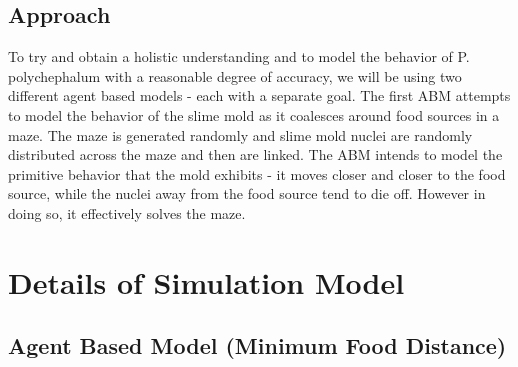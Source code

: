 \documentclass[a4paper, 11pt]{article}
\begin{document}
\subsection{Approach}

To try and obtain a holistic understanding and to model the behavior of P. polychephalum with a reasonable degree of accuracy, we will be using two different agent based models - each with a separate goal. The first ABM attempts to model the behavior of the slime mold as it coalesces around food sources in a maze. The maze is generated randomly and slime mold nuclei are randomly distributed across the maze and then are linked. The ABM intends to model the primitive behavior that the mold exhibits - it moves closer and closer to the food source, while the nuclei away from the food source tend to die off. However in doing so, it effectively solves the maze. 

\section {Details of Simulation Model}
\subsection{Agent Based Model (Minimum Food Distance)}
\end{document}
